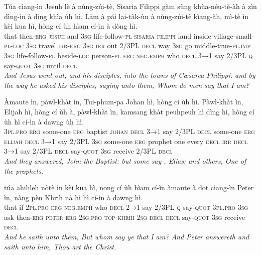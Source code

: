 \documentclass[11pt,a4paper]{article}
\begin{document}
\begin{exe}
\gll Túa cìang-ìn Jesuh lè à nùng-zúi-tè, Sisaria Filippi gàm sùng khùa-néu-tè-àh à zìn dìng-ìn à dìng khìa ùh hì. Lām à pái lai-tàk-ùn à nùng-zúi-tè kìang-àh, mì-tè ìn kèi kua hì, hòng cí ùh hìam cí-ìn à dòng hì. \\
     that then-\textsc{erg} \textsc{jesuh} and \textsc{3sg} life-follow-\textsc{pl} \textsc{sisaria} \textsc{filippi} land inside village-small-\textsc{pl}-\textsc{loc} \textsc{3sg} travel \textsc{irr}-\textsc{erg} \textsc{3sg} \textsc{irr} out 2/3PL \textsc{decl} way \textsc{3sg} go middle-true-\textsc{pl}.\textsc{imp} \textsc{3sg} life-follow-\textsc{pl} beside-\textsc{loc} person-\textsc{pl} \textsc{erg} \textsc{neg}.\textsc{emph} who \textsc{decl} \textsc{3→1} say 2/3PL \textsc{q} say-\textsc{quot} \textsc{3sg} until \textsc{decl} \\
\glt \textcolor{kjvcolor}{\textit{And Jesus went out, and his disciples, into the towns of Cæsarea Philippi: and by the way he asked his disciples, saying unto them, Whom do men say that I am?}}

\gll Àmaute ìn, pàwl-khàt ìn, Tui-phum-pa Johan hì, hòng cí ùh hì. Pàwl-khàt ìn, Elijah hì, hòng cí ùh à, pàwl-khàt ìn, kamsang khàt peuhpeuh hì dìng hì, hòng cí ùh hì cí-ìn à dawng ùh hì. \\
     \textsc{3pl}.\textsc{pro} \textsc{erg} some-one \textsc{erg} baptist \textsc{johan} \textsc{decl} \textsc{3→1} say 2/3PL \textsc{decl} some-one \textsc{erg} \textsc{elijah} \textsc{decl} \textsc{3→1} say 2/3PL \textsc{3sg} some-one \textsc{erg} prophet one every \textsc{decl} \textsc{irr} \textsc{decl} \textsc{3→1} say 2/3PL \textsc{decl} say-\textsc{quot} \textsc{3sg} receive 2/3PL \textsc{decl} \\
\glt \textcolor{kjvcolor}{\textit{And they answered, John the Baptist: but some say , Elias; and others, One of the prophets.}}

\gll túa ahihleh nòtè ìn kèi kua hì, nong cí ùh hìam cí-ìn àmaute à dot cìang-ìn Peter ìn, nàng pèn Khrih nà hì hì cí-ìn à dawng hì. \\
     that if \textsc{2pl}.\textsc{pro} \textsc{erg} \textsc{neg}.\textsc{emph} who \textsc{decl} \textsc{2→1} say 2/3PL \textsc{q} say-\textsc{quot} \textsc{3pl}.\textsc{pro} \textsc{3sg} ask then-\textsc{erg} \textsc{peter} \textsc{erg} \textsc{2sg}.\textsc{pro} \textsc{top} \textsc{khrih} \textsc{2sg} \textsc{decl} \textsc{decl} say-\textsc{quot} \textsc{3sg} receive \textsc{decl} \\
\glt \textcolor{kjvcolor}{\textit{And he saith unto them, But whom say ye that I am? And Peter answereth and saith unto him, Thou art the Christ.}}


\end{exe}
\end{document}
